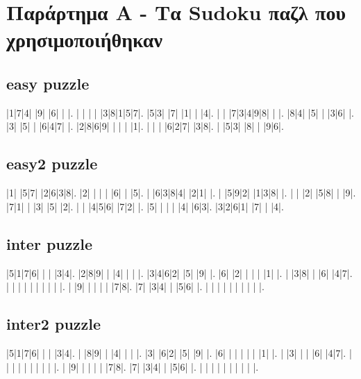 \documentclass[a4paper,12pt]{article}
\begin{document}

\section{Παράρτημα A - Τα Sudoku παζλ που χρησιμοποιήθηκαν}

\subsection{easy puzzle}

\setlength\sudokusize{7cm}

\begin{sudoku}
|1|7|4| |9| |6| | |.
| | | | |3|8|1|5|7|.
|5|3| |7| |1| | |4|.
| | |7|3|4|9|8| | |.
|8|4| |5| | |3|6| |.
|3| |5| | |6|4|7| |.
|2|8|6|9| | | | |1|.
| | | |6|2|7| |3|8|.
| |5|3| |8| | |9|6|.
\end{sudoku}


\subsection{easy2 puzzle}

\begin{sudoku}
|1| |5|7| |2|6|3|8|.
|2| | | | |6| | |5|.
| |6|3|8|4| |2|1| |.
| |5|9|2| |1|3|8| |.
| | |2| |5|8| | |9|.
|7|1| | |3| |5| |2|.
| | |4|5|6| |7|2| |.
|5| | | | |4| |6|3|.
|3|2|6|1| |7| | |4|.
\end{sudoku}


\subsection{inter puzzle}

\begin{sudoku}
|5|1|7|6| | | |3|4|.
|2|8|9| | |4| | | |.
|3|4|6|2| |5| |9| |.
|6| |2| | | | |1| |.
| |3|8| | |6| |4|7|.
| | | | | | | | | |.
| |9| | | | | |7|8|.
|7| |3|4| | |5|6| |.
| | | | | | | | | |.
\end{sudoku}


\subsection{inter2 puzzle}

\begin{sudoku}
|5|1|7|6| | | |3|4|.
| |8|9| | |4| | | |.
|3| |6|2| |5| |9| |.
|6| | | | | | |1| |.
| |3| | | |6| |4|7|.
| | | | | | | | | |.
| |9| | | | | |7|8|.
|7| |3|4| | |5|6| |.
| | | | | | | | | |.
\end{sudoku}
\end{document}

